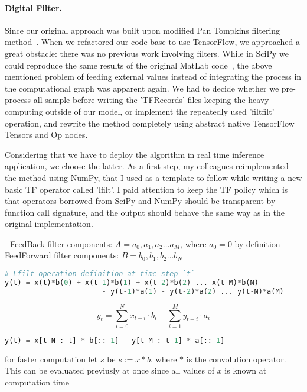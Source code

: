\paragraph{Digital Filter.}
Since our original approach was built upon modified Pan Tompkins filtering method~\cite{pan1985real}.
When we refactored our code base to use TensorFlow, we approached a great obstacle: there was no previous work involving filters.
While in SciPy we could reproduce the same results of the original MatLab code~\cite{noauthor_complete_nodate}, the above mentioned problem of feeding external values instead of integrating the process in the computational graph was apparent again.
We had to decide whether we pre-process all sample before writing the 'TFRecords' files keeping the heavy computing outside of our model, or implement the repeatedly used 'filtfilt' operation, and rewrite the method completely using abstract native TensorFlow Tensors and Op nodes.

Considering that we have to deploy the algorithm in real time inference application, we choose the latter.
As a first step, my colleagues reimplemented the method using NumPy, that I used as a template to follow while writing a new basic TF operator called 'lfilt'.
I paid attention to keep the TF policy which is that operators borrowed from SciPy and NumPy should be transparent by function call signature, and the output should behave the same way as in the original implementation.


- FeedBack filter components:   $A = a_0, a_1, a_2 \dots a_M$, where $a_0 = 0$ by definition
- FeedForward filter components:   $B = b_0, b_1, b_2 \dots b_N$

\begin{lstlisting}[language=Python]
# Lfilt operation definition at time step `t`
y(t) = x(t)*b(0) + x(t-1)*b(1) + x(t-2)*b(2) ... x(t-M)*b(N)
                       - y(t-1)*a(1) - y(t-2)*a(2) ... y(t-N)*a(M)
\end{lstlisting}

$$
y_t = \sum_{i=0}^{N} x_{t-i} \cdot b_{i} - \sum_{i=1}^{M} y_{t-i} \cdot a_{i}
$$


\begin{lstlisting}[language=Python]
y(t) = x[t-N : t] * b[::-1] - y[t-M : t-1] * a[::-1]
\end{lstlisting}


for faster computation let $s$ be $s := x \ast b$, where $\ast$ is the convolution operator. This can be evaluated previusly at once since all values of $x$ is known at computation time

